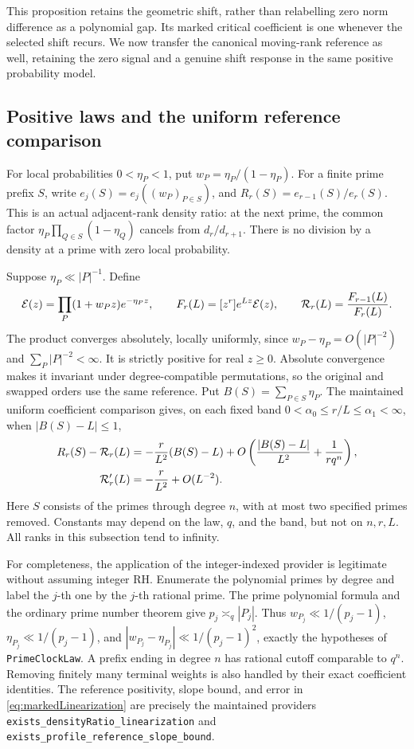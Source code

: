 \documentclass[11pt]{article}
\begin{document}
This proposition retains the geometric shift, rather than relabelling
zero norm difference as a polynomial gap. Its marked critical coefficient
is one whenever the selected shift recurs. We now transfer the canonical
moving-rank reference as well, retaining the zero signal and a genuine
shift response in the same positive probability model.

\subsection{Positive laws and the uniform reference comparison}
For local probabilities \(0<\eta_P<1\), put \(w_P=\eta_P/(1-\eta_P)\).
For a finite prime prefix \(S\), write \(e_j(S)=e_j((w_P)_{P\in S})\),
and \(R_r(S)=e_{r-1}(S)/e_r(S)\). This is an actual adjacent-rank
density ratio: at the next prime, the common factor
\(\eta_P\prod_{Q\in S}(1-\eta_Q)\) cancels from \(d_r/d_{r+1}\).
There is no division by a density at a prime with zero local probability.

Suppose \(\eta_P\ll|P|^{-1}\). Define
\[
 {\cal E}(z)=\prod_P(1+w_Pz)e^{-\eta_Pz},\qquad
 F_r(L)=[z^r]e^{Lz}{\cal E}(z),\qquad
 {\cal R}_r(L)=\frac{F_{r-1}(L)}{F_r(L)}.
\]
The product converges absolutely, locally uniformly, since
\(w_P-\eta_P=O(|P|^{-2})\) and \(\sum_P|P|^{-2}<\infty\).
It is strictly positive for real \(z\geq0\).
Absolute convergence makes it invariant under degree-compatible
permutations, so the original and swapped orders use the same reference.
Put \(B(S)=\sum_{P\in S}\eta_P\).
The maintained uniform coefficient comparison gives, on each fixed band
\(0<\alpha_0\leq r/L\leq\alpha_1<\infty\), when \(|B(S)-L|\leq1\),
\begin{align}
 R_r(S)-{\cal R}_r(L)
 &=-\frac r{L^2}(B(S)-L)
   +O\left(\frac{|B(S)-L|}{L^2}+\frac1{r q^n}\right),
 \label{eq:markedLinearization}\\
 {\cal R}'_r(L)&=-\frac r{L^2}+O(L^{-2}).
 \label{eq:markedSlope}
\end{align}
Here \(S\) consists of the primes through degree \(n\), with at most two
specified primes removed. Constants may depend on the law, \(q\), and the
band, but not on \(n,r,L\). All ranks in this subsection tend to infinity.

For completeness, the application of the integer-indexed provider is
legitimate without assuming integer RH. Enumerate the polynomial primes
by degree and label the \(j\)-th one by the \(j\)-th rational prime.
The prime polynomial formula and the ordinary prime number theorem give
\(p_j\asymp_q |P_j|\). Thus \(w_{P_j}\ll1/(p_j-1)\),
\(\eta_{P_j}\ll1/(p_j-1)\), and
\(|w_{P_j}-\eta_{P_j}|\ll1/(p_j-1)^2\), exactly the hypotheses of
\texttt{PrimeClockLaw}. A prefix ending in degree \(n\) has rational cutoff
comparable to \(q^n\). Removing finitely many terminal weights is also
handled by their exact coefficient identities. The reference positivity,
slope bound, and error in \eqref{eq:markedLinearization} are precisely the
maintained providers \texttt{exists\_densityRatio\_linearization} and
\texttt{exists\_profile\_reference\_slope\_bound}.
\end{document}
